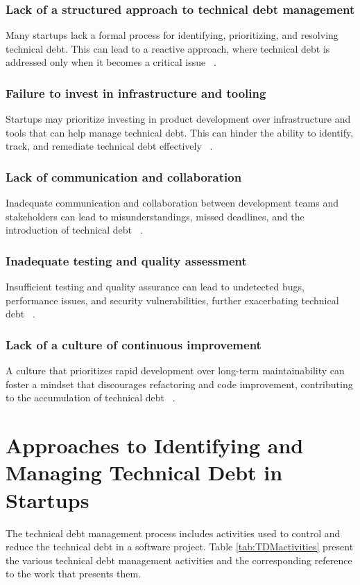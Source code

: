 \subsubsection{Lack of a structured approach to technical debt management} 
Many startups lack a formal process for identifying, prioritizing, and resolving technical debt. This can lead to a reactive approach, where technical debt is addressed only when it becomes a critical issue ~\cite{FowlerBottlenecks}.

\subsubsection{Failure to invest in infrastructure and tooling} 
Startups may prioritize investing in product development over infrastructure and tools that can help manage technical debt. This can hinder the ability to identify, track, and remediate technical debt effectively ~\cite{Blog21:online,Totalqua26:online}.

\subsubsection{Lack of communication and collaboration}
Inadequate communication and collaboration between development teams and stakeholders can lead to misunderstandings, missed deadlines, and the introduction of technical debt ~\cite{Whopayso60:online,TheTop5S17:online}.

\subsubsection{Inadequate testing and quality assessment}
Insufficient testing and quality assurance can lead to undetected bugs, performance issues, and security vulnerabilities, further exacerbating technical debt ~\cite{HowtoGet43:online}.

\subsubsection{Lack of a culture of continuous improvement}
A culture that prioritizes rapid development over long-term maintainability can foster a mindset that discourages refactoring and code improvement, contributing to the accumulation of technical debt ~\cite{FowlerBottlenecks,Whopayso60:online}.



\section{Approaches to Identifying and Managing Technical Debt in Startups}
The technical debt management process includes activities used to control and reduce the technical debt in a software project. Table \ref{tab:TDMactivities} present the various technical debt management activities and the corresponding reference to the work that presents them.

